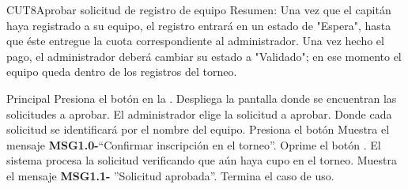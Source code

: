 


	\begin{UseCase}{CUT8}{Aprobar solicitud de registro de equipo}{
		Resumen: Una vez que el capitán haya registrado a su equipo, el registro entrará en un estado de "Espera", hasta que éste entregue la cuota correspondiente al administrador. Una vez hecho el pago, el administrador deberá cambiar su estado a "Validado"; en ese momento el equipo queda dentro de los registros del torneo.	}
		
	\end{UseCase}
	\newpage
	
	
	\begin{UCtrayectoria}{Principal}
	\UCpaso[\UCactor] Presiona el botón  en la . 
	\UCpaso Despliega la pantalla  donde se encuentran las solicitudes a aprobar. 
	\UCpaso[\UCactor] El administrador elige la solicitud a aprobar. Donde cada solicitud se identificará por el nombre del equipo.
	\UCpaso[\UCactor] Presiona el botón 
	\UCpaso Muestra el mensaje {\bf MSG1.0-}``Confirmar inscripción en el torneo''.
	\UCpaso[\UCactor] Oprime el botón .	
	\UCpaso El sistema procesa la solicitud verificando que aún haya cupo en el torneo.
	\UCpaso Muestra el mensaje {\bf MSG1.1-} ''Solicitud aprobada''.  
	\UCpaso[] Termina el caso de uso.   
\end{UCtrayectoria}

